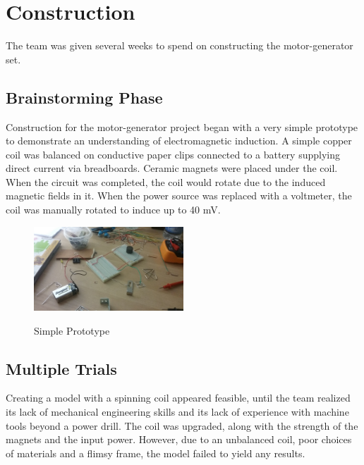 \section{Construction}
The team was given several weeks to spend on constructing the motor-generator set.

    \subsection{Brainstorming Phase}
    Construction for the motor-generator project began with a very simple prototype to demonstrate an understanding of electromagnetic induction. A simple copper coil was balanced on conductive paper clips connected to a battery supplying direct current via breadboards. Ceramic magnets were placed under the coil. When the circuit was completed, the coil would rotate due to the induced magnetic fields in it. When the power source was replaced with a voltmeter, the coil was manually rotated to induce up to 40 mV.

    \begin{figure}[ht]
        \begin{center}
            \includegraphics[width=0.5\textwidth]{figures/models/1.jpg}
            \label{fig:model1}
        \end{center} \caption{Simple Prototype}
    \end{figure}

    \subsection{Multiple Trials}
    Creating a model with a spinning coil appeared feasible, until the team realized its lack of mechanical engineering skills and its lack of experience with machine tools beyond a power drill. The coil was upgraded, along with the strength of the magnets and the input power. However, due to an unbalanced coil, poor choices of materials and a flimsy frame, the model failed to yield any results.\\

